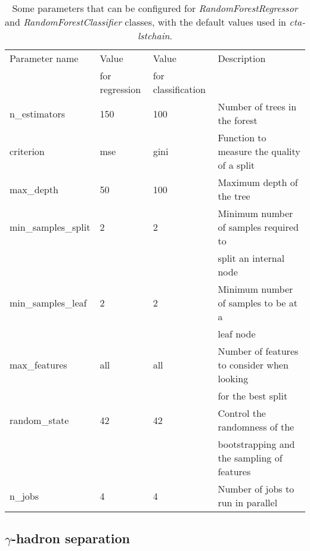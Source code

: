 \documentclass[main.tex]{subfiles}
\begin{document}
\begin{table}
  \centering
  \begin{tabular}{|l|l|l|l|}
    \hline
    Parameter name & Value          & Value              & Description\\
                   & for regression & for classification &  \\ 
    \hline
    n\_estimators       & 150 & 100  & \small{Number of trees in the forest}\\
    criterion           & mse & gini & \small{Function to measure the quality of a split}\\
    max\_depth          & 50  & 100  & \small{Maximum depth of the tree}\\
    min\_samples\_split & 2   & 2    & \small{Minimum number of samples required to}\\
                        &     &      & \small{split an internal node} \\ 
    min\_samples\_leaf  & 2   & 2    & \small{Minimum number of samples to be at a}\\
                        &     &      & \small{leaf node} \\     
    max\_features       & all & all  & \small{Number of features to consider when looking} \\
                        &     &      & \small{for the best split}\\
    random\_state       & 42  & 42   & \small{Control the randomness of the} \\
                        &     &      & \small{bootstrapping and the sampling of features}\\
    n\_jobs             & 4   & 4    & \small{Number of jobs to run in parallel}\\
    \hline
  \end{tabular}
  \caption{Some parameters that can be configured for \textit{RandomForestRegressor} and \textit{RandomForestClassifier} classes, with the default values used in \textit{cta-lstchain}.}
  \label{tab:RFpars}
  \end{table}

\subsection{$\gamma$-hadron separation}
\end{document}

